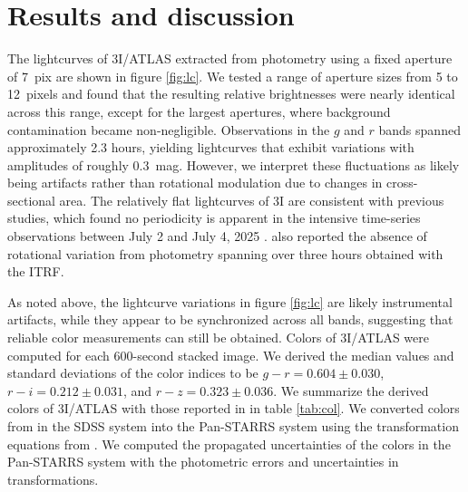 \documentclass[]{pasj02}
\newcommand\I{3I/ATLAS\xspace}
\newcommand\gr{$g-r=0.604\pm0.030$\xspace}
\newcommand\ri{$r-i=0.212\pm0.031$\xspace}
\newcommand\rz{$r-z=0.323\pm0.036$\xspace}
\begin{document}
\section{Results and discussion}\label{sec:res}
The lightcurves of \I extracted from photometry using a fixed aperture of 7~pix are shown in figure \ref{fig:lc}.
We tested a range of aperture sizes from 5 to 12~pixels and found that the resulting relative brightnesses were nearly identical across this range, except for the largest apertures, where background contamination became non-negligible.
Observations in the $g$ and $r$ bands spanned approximately 2.3 hours, yielding lightcurves that exhibit variations with amplitudes of roughly 0.3~mag.
However, we interpret these fluctuations as likely being artifacts rather than rotational modulation due to changes in cross-sectional area.
The relatively flat lightcurves of 3I are consistent with previous studies, which found no periodicity is apparent in the intensive time-series observations between July 2 and July 4, 2025 \citep{Seligman2025_3I}. 
\citep{Kareta2025_3I} also reported the absence of rotational variation from photometry spanning over three hours obtained with the ITRF.

As noted above, the lightcurve variations in figure \ref{fig:lc} are likely
instrumental artifacts, while they appear to be synchronized across all bands, suggesting that reliable color measurements can still be obtained.
Colors of \I were computed for each 600-second stacked image.
We derived the median values and standard deviations of the color indices to be \gr, \ri, and \rz.
We summarize the derived colors of \I with those reported in \citet{Bolin2025_3I} in table \ref{tab:col}.
We converted colors from \citet{Bolin2025_3I} in the SDSS system into the Pan-STARRS system using the transformation equations from \cite{Tonry2012}.
We computed the propagated uncertainties of the colors in the Pan-STARRS system with the photometric errors and uncertainties in transformations.
\end{document}
